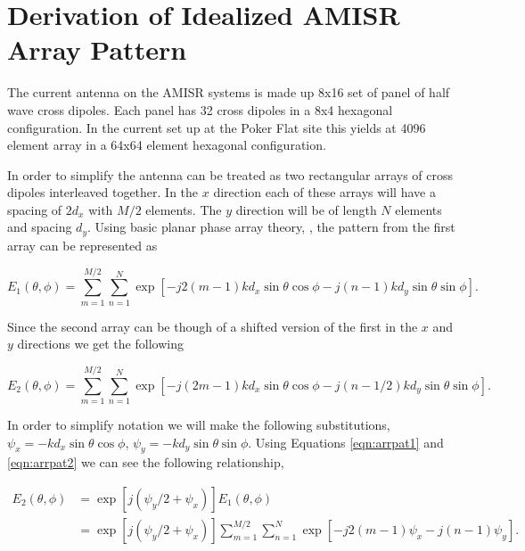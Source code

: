\chapter{Derivation of Idealized AMISR Array Pattern}
 \label{App:AMISRarr}
\thispagestyle{myheadings}
\graphicspath{{Appendix/Figures/}}

The current antenna on the AMISR systems is made up 8x16 set of panel of half wave cross dipoles. Each panel has 32 cross dipoles in a 8x4 hexagonal configuration. In the current set up at the Poker Flat site this yields at 4096 element array in a 64x64 element hexagonal configuration.

In order to simplify the antenna can be treated as two rectangular arrays of cross dipoles interleaved together. In the $x$ direction each of these arrays will have a spacing of $2d_x$ with $M/2$ elements. The $y$ direction will be of length $N$ elements and spacing $d_y$. Using basic planar phase array theory, \cite{Balanis:2005:ATA:1208379}, the pattern from the first array can be represented as 

\begin{equation}
\label{eqn:arrpat1}
E_1(\theta,\phi) =\displaystyle \sum_{m=1}^{M/2}\sum_{n=1}^{N} \exp\left[-j2\left(m-1\right)kd_x\sin\theta\cos\phi -j\left(n-1\right) k d_y\sin\theta\sin\phi\right].
\end{equation}

\noindent Since the second array can be though of a shifted version of the first in the $x$ and $y$ directions we get the following

\begin{equation}
\label{eqn:arrpat2}
E_2(\theta,\phi) =\displaystyle \sum_{m=1}^{M/2}\sum_{n=1}^{N} \exp\left[-j\left(2m-1\right)kd_x\sin\theta\cos\phi -j\left(n-1/2\right) k d_y\sin\theta\sin\phi\right].
\end{equation}

In order to simplify notation we will make the following substitutions, $\psi_x = -k d_x\sin\theta\cos\phi$, $\psi_y = -k d_y\sin\theta\sin\phi$. Using Equations \ref{eqn:arrpat1} and \ref{eqn:arrpat2} we can see the following relationship,

\begin{equation}
\label{eqn:arrpateqn}
\begin{split}
E_2(\theta,\phi)  &=  \exp\left[j(\psi_y/2 + \psi_x)\right] E_1(\theta,\phi)  \\&= \exp\left[j(\psi_y/2 + \psi_x)\right]  \displaystyle \sum_{m=1}^{M/2}\sum_{n=1}^{N}  \exp\left[-j2\left(m-1\right) \psi_x -j\left(n-1\right) \psi_y\right].
\end{split}
\end{equation}

